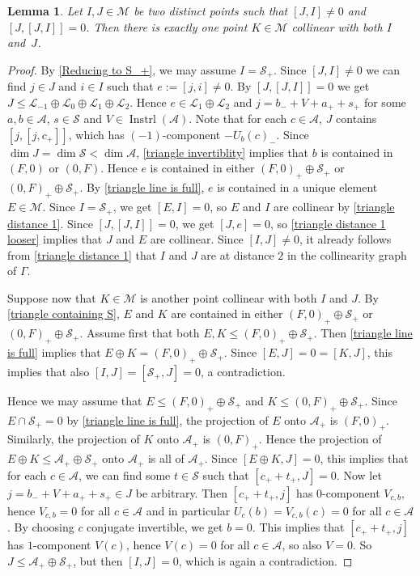 \documentclass[oneside,a4paper]{amsart} %
\newtheorem{lemma}[theorem]{Lemma}
\theoremstyle{definition}
\DeclareMathOperator{\Inst}{Instrl}
\newcommand{\A}{\mathcal{A}}
\renewcommand{\SS}{\mathcal{S}}
\newcommand{\LL}{\mathcal{L}}
\newcommand{\M}{\mathcal{M}}
\newcommand{\dash}{\nobreakdash-\hspace{0pt}}
\numberwithin{equation}{section}
\begin{document}
\begin{lemma}
\label{triangle distance 2}
	Let $I,J\in\M$ be two distinct points such that $[J,I]\neq 0$ and $[J,[J,I]]=0$.
	Then there is exactly one point $K \in \M$ collinear with both $I$ and~$J$.
\end{lemma}
\begin{proof}
	By \cref{Reducing to S_+}, we may assume $I=\SS_+$.
	Since $[J,I]\neq 0$ we can find $j\in J$ and $i\in I$ such that $e:=[j,i]\neq 0$.
	By $[J,[J,I]]=0$ we get $J \leq \LL_{-1} \oplus \LL_0 \oplus \LL_1 \oplus \LL_2$.
	Hence $e \in \LL_1 \oplus \LL_2$ and $j = b_- + V + a_+ + s_+$ for some $a,b\in\A$, $s\in\SS$ and $V\in\Inst (\A)$.
	Note that for each $c \in \A$, $J$ contains $[j,[j,c_+]]$, which has $(-1)$\dash component $-U_b(c)_-$.
	Since $\dim J= \dim \SS < \dim \A$, \cref{triangle invertiblity} implies that $b$ is contained in $(F,0)$ or $(0,F)$.
	Hence $e$ is contained in either $(F,0)_+ \oplus \SS_+$ or $(0,F)_+ \oplus \SS_+$.
	By \cref{triangle line is full}, $e$ is contained in a unique element $E\in\M$.
	Since $I=\SS_+$, we get $[E,I]=0$, so $E$ and $I$ are collinear by \cref{triangle distance 1}.
	Since $[J,[J,I]]=0$, we get $[J,e]=0$, so \cref{triangle distance 1 looser} implies that $J$ and $E$ are collinear.
	Since $[I,J] \neq 0$, it already follows from \cref{triangle distance 1} that $I$ and $J$ are at distance $2$ in the collinearity graph of $\Gamma$.
	
	Suppose now that $K \in \M$ is another point collinear with both $I$ and $J$.
	By \cref{triangle containing S}, $E$ and $K$ are contained in either $(F,0)_+ \oplus \SS_+$ or $(0,F)_+ \oplus \SS_+$.
	Assume first that both $E,K\leq (F,0)_+ \oplus \SS_+$.
	Then \cref{triangle line is full} implies that $E\oplus K= (F,0)_+ \oplus \SS_+$.
	Since $[E,J]=0=[K,J]$, this implies that also $[I,J]=[\SS_+,J]=0$, a contradiction.
	
	Hence we may assume that $E\leq (F,0)_+ \oplus \SS_+$ and $K\leq (0,F)_+ \oplus \SS_+$.
	Since $E\cap \SS_+=0$ by \cref{triangle line is full}, the projection of $E$ onto $\A_+$ is $(F,0)_+$.
	Similarly, the projection of $K$ onto $\A_+$ is $(0,F)_+$.
	Hence the projection of $E \oplus K \leq \A_+ \oplus \SS_+$ onto $\A_+$ is all of $\A_+$.
	Since $[E \oplus K,J]=0$, this implies that for each $c \in \A$, we can find some $t \in \SS$ such that $[c_+ + t_+, J] = 0$.
	Now let $j = b_- + V + a_+ + s_+ \in J$ be arbitrary.
	Then $[c_+ + t_+, j]$ has $0$-component $V_{c,b}$, hence $V_{c,b}=0$ for all $c\in\A$ and in particular $U_c(b) = V_{c,b}(c) = 0$ for all $c \in \A$. By choosing $c$ conjugate invertible, we get $b=0$.
	This implies that $[c_+ + t_+, j]$ has $1$-component $V(c)$, hence $V(c) = 0$ for all $c \in \A$, so also $V = 0$.
	So $J \leq \A_+ \oplus \SS_+$, but then $[I,J]=0$, which is again a contradiction.
\end{proof}
\end{document}
